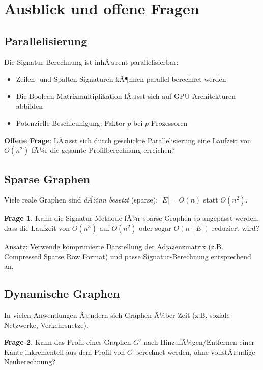 ﻿\documentclass[a4paper,12pt]{article}
\theoremstyle{definition}
\newtheorem{frage}{Frage}
\begin{document}
	\section{Ausblick und offene Fragen}
	
	\subsection{Parallelisierung}
	
	Die Signatur-Berechnung ist inhÃ¤rent parallelisierbar:
	
	\begin{itemize}
		\item[-] Zeilen- und Spalten-Signaturen kÃ¶nnen parallel berechnet werden
		\item[-] Die Boolean Matrixmultiplikation lÃ¤sst sich auf GPU-Architekturen abbilden
		\item[-] Potenzielle Beschleunigung: Faktor $p$ bei $p$ Prozessoren
	\end{itemize}
	
	\textbf{Offene Frage}: LÃ¤sst sich durch geschickte Parallelisierung eine Laufzeit von $O(n^2)$ fÃ¼r die gesamte Profilberechnung erreichen?
	
	\subsection{Sparse Graphen}
	
	Viele reale Graphen sind \textit{dÃ¼nn besetzt} (sparse): $|E| = O(n)$ statt $O(n^2)$.
	
	\begin{frage}
		Kann die Signatur-Methode fÃ¼r sparse Graphen so angepasst werden, dass die Laufzeit von $O(n^3)$ auf $O(n^2)$ oder sogar $O(n \cdot |E|)$ reduziert wird?
	\end{frage}
	
	Ansatz: Verwende komprimierte Darstellung der Adjazenzmatrix (z.B. Compressed Sparse Row Format) und passe Signatur-Berechnung entsprechend an.
	
	\subsection{Dynamische Graphen}
	
	In vielen Anwendungen Ã¤ndern sich Graphen Ã¼ber Zeit (z.B. soziale Netzwerke, Verkehrsnetze).
	
	\begin{frage}
		Kann das Profil eines Graphen $G'$ nach HinzufÃ¼gen/Entfernen einer Kante inkrementell aus dem Profil von $G$ berechnet werden, ohne vollstÃ¤ndige Neuberechnung?
	\end{frage}
	
\end{document}
